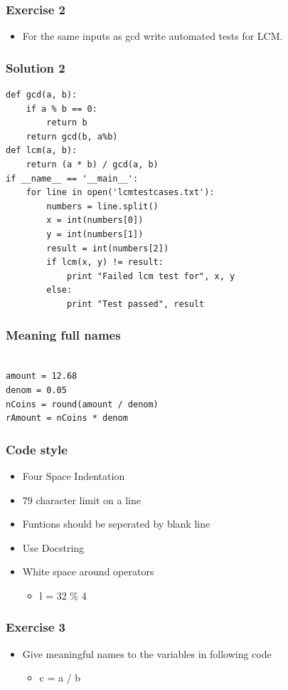 \documentclass[presentation]{beamer}
\begin{document}
\begin{frame}
\frametitle{Exercise 2}
\label{sec-9}


\begin{itemize}
\item For the same inputs as gcd write automated tests for LCM.
\end{itemize}
\end{frame}
\begin{frame}[fragile]
\frametitle{Solution 2}
\label{sec-10}

\lstset{language=Python}
\begin{lstlisting}
def gcd(a, b):
    if a % b == 0: 
        return b
    return gcd(b, a%b)
def lcm(a, b):
    return (a * b) / gcd(a, b)
if __name__ == '__main__':
    for line in open('lcmtestcases.txt'):
        numbers = line.split()
        x = int(numbers[0])
        y = int(numbers[1])
        result = int(numbers[2])
        if lcm(x, y) != result:
            print "Failed lcm test for", x, y
        else:
            print "Test passed", result
\end{lstlisting}
\end{frame}
\begin{frame}[fragile]
\frametitle{Meaning full names}
\label{sec-11}

\lstset{language=Python}
\begin{lstlisting}

amount = 12.68
denom = 0.05
nCoins = round(amount / denom)
rAmount = nCoins * denom
\end{lstlisting}
\end{frame}
\begin{frame}
\frametitle{Code style}
\label{sec-12}


\begin{itemize}
\item Four Space Indentation
\item 79 character limit on a line
\item Funtions should be seperated by 
   blank line
\item Use Docstring
\item White space around operators
\begin{itemize}
\item l = 32 \% 4
\end{itemize}
\end{itemize}
\end{frame}
\begin{frame}
\frametitle{Exercise 3}
\label{sec-13}


\begin{itemize}
\item Give meaningful names to the variables in following
     code
\begin{itemize}
\item c = a / b
\end{itemize}
\end{itemize}
\end{frame}
\end{document}
